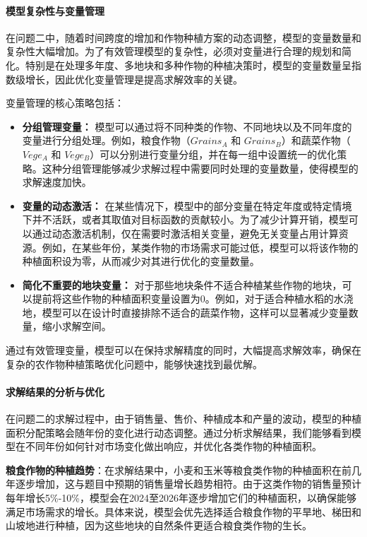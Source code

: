 \documentclass[12pt,a4paper]{nmmcm}
\begin{document}
\paragraph{模型复杂性与变量管理}

在问题二中，随着时间跨度的增加和作物种植方案的动态调整，模型的变量数量和复杂性大幅增加。为了有效管理模型的复杂性，必须对变量进行合理的规划和简化。特别是在处理多年度、多地块和多种作物的种植决策时，模型的变量数量呈指数级增长，因此优化变量管理是提高求解效率的关键。

变量管理的核心策略包括：

\begin{itemize}
    \item \textbf{分组管理变量：} 模型可以通过将不同种类的作物、不同地块以及不同年度的变量进行分组处理。例如，粮食作物（$Grains_A$ 和 $Grains_B$）和蔬菜作物（$Vege_A$ 和 $Vege_B$）可以分别进行变量分组，并在每一组中设置统一的优化策略。这种分组管理能够减少求解过程中需要同时处理的变量数量，使得模型的求解速度加快。
    
    \item \textbf{变量的动态激活：} 在某些情况下，模型中的部分变量在特定年度或特定情境下并不活跃，或者其取值对目标函数的贡献较小。为了减少计算开销，模型可以通过动态激活机制，仅在需要时激活相关变量，避免无关变量占用计算资源。例如，在某些年份，某类作物的市场需求可能过低，模型可以将该作物的种植面积设为零，从而减少对其进行优化的变量数量。
    
    \item \textbf{简化不重要的地块变量：} 对于那些地块条件不适合种植某些作物的地块，可以提前将这些作物的种植面积变量设置为0。例如，对于适合种植水稻的水浇地，模型可以在设计时直接排除不适合的蔬菜作物，这样可以显著减少变量数量，缩小求解空间。
\end{itemize}

通过有效管理变量，模型可以在保持求解精度的同时，大幅提高求解效率，确保在复杂的农作物种植策略优化问题中，能够快速找到最优解。

\paragraph{求解结果的分析与优化}

在问题二的求解过程中，由于销售量、售价、种植成本和产量的波动，模型的种植面积分配策略会随年份的变化进行动态调整。通过分析求解结果，我们能够看到模型在不同年份如何针对市场变化做出响应，并优化各类作物的种植面积。

\textbf{粮食作物的种植趋势}：在求解结果中，小麦和玉米等粮食类作物的种植面积在前几年逐步增加，这与题目中预期的销售量增长趋势相符。由于这类作物的销售量预计每年增长5\%-10\%，模型会在2024至2026年逐步增加它们的种植面积，以确保能够满足市场需求的增长。具体来说，模型会优先选择适合粮食作物的平旱地、梯田和山坡地进行种植，因为这些地块的自然条件更适合粮食类作物的生长。
\end{document}
